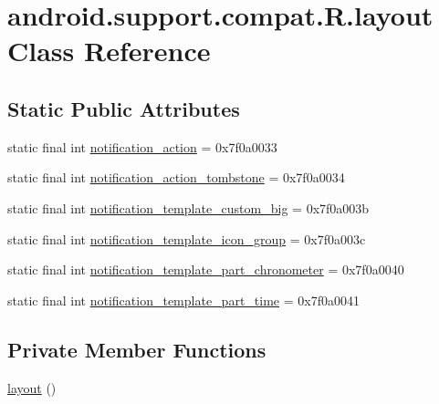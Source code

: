 \hypertarget{classandroid_1_1support_1_1compat_1_1_r_1_1layout}{}\section{android.\+support.\+compat.\+R.\+layout Class Reference}
\label{classandroid_1_1support_1_1compat_1_1_r_1_1layout}
\subsection*{Static Public Attributes}
\begin{DoxyCompactItemize}
\item 
static final int \mbox{\hyperlink{classandroid_1_1support_1_1compat_1_1_r_1_1layout_ad79e4fe83c760de6618f10481cf5fcc0}{notification\+\_\+action}} = 0x7f0a0033
\item 
static final int \mbox{\hyperlink{classandroid_1_1support_1_1compat_1_1_r_1_1layout_af9477b0f36fd53636d0a5d7bd5886ce4}{notification\+\_\+action\+\_\+tombstone}} = 0x7f0a0034
\item 
static final int \mbox{\hyperlink{classandroid_1_1support_1_1compat_1_1_r_1_1layout_a0b54b8630957de0e06eef8abefdf814e}{notification\+\_\+template\+\_\+custom\+\_\+big}} = 0x7f0a003b
\item 
static final int \mbox{\hyperlink{classandroid_1_1support_1_1compat_1_1_r_1_1layout_a5cbbbeccfd09c138a8cc351aa1a7adce}{notification\+\_\+template\+\_\+icon\+\_\+group}} = 0x7f0a003c
\item 
static final int \mbox{\hyperlink{classandroid_1_1support_1_1compat_1_1_r_1_1layout_aeea5b97200646849c345579998f4543e}{notification\+\_\+template\+\_\+part\+\_\+chronometer}} = 0x7f0a0040
\item 
static final int \mbox{\hyperlink{classandroid_1_1support_1_1compat_1_1_r_1_1layout_a6cb602573ee4bfe6e0e12b0493d0350f}{notification\+\_\+template\+\_\+part\+\_\+time}} = 0x7f0a0041
\end{DoxyCompactItemize}
\subsection*{Private Member Functions}
\begin{DoxyCompactItemize}
\item 
\mbox{\hyperlink{classandroid_1_1support_1_1compat_1_1_r_1_1layout_afddcee80f0a158cb1ab1bd4ee049cf30}{layout}} ()
\end{DoxyCompactItemize}


